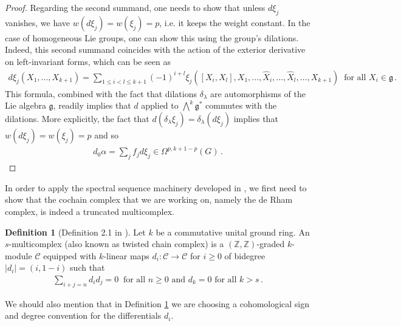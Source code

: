 \documentclass[dvipsnames]{amsart}
\theoremstyle{definition}
\newtheorem{definition}[theorem]{Definition}
\theoremstyle{definition}
\numberwithin{equation}{section}
\newcommand{\Z}{\mathbb{Z}}
\begin{document}
\begin{proof}
Regarding the second summand, one needs to show that unless $d\xi_j$ vanishes, we have $w(d\xi_j)=w(\xi_j)=p$, i.e. it keeps the weight constant. In the case of homogeneous Lie groups, one can show this using the group's dilations. Indeed, this second summand coincides with the action of the exterior derivative on left-invariant forms, which can be seen as
\begin{align}\label{eq: formula for d_0}
    d\xi_j(X_1,\ldots,X_{k+1})=\sum_{1\le i<l\le k+1}(-1)^{i+l}\xi_j([X_i,X_l],X_1,\ldots,\hat{X}_i,\ldots,\hat{X}_l,\ldots,X_{k+1})\ \text{ for all }X_i\in\mathfrak{g}\,.
\end{align}
This formula, combined with the fact that dilations $\delta_\lambda$ are automorphisms of the Lie algebra $\mathfrak{g}$, readily implies that $d$ applied to $\bigwedge^k\mathfrak{g}^\ast$ commutes with the dilations. More explicitly, the fact that  $d(\delta_\lambda\xi_j)=\delta_\lambda(d\xi_j)$ implies that $w(d\xi_j)=w(\xi_j)=p$ and so
\begin{align*}
    d_0\alpha=\sum_jf_jd\xi_j\in\Omega^{p,k+1-p}(G)\,.
\end{align*}
\end{proof}
In order to apply the spectral sequence machinery developed in \cite{tripaldi2026spectralcomplexestruncatedmulticomplexes}, we first need to show that the cochain complex that we are working on, namely the de Rham complex, is indeed a truncated multicomplex.
\begin{definition}[Definition 2.1 in \cite{livernet2020spectral}] \label{def: multicomplex}Let $k$ be a commutative unital ground ring. An $s$-multicomplex (also known as twisted chain complex) is a $(\Z,\Z)$-graded $k$-module $\mathcal{C}$ equipped with $k$-linear maps $d_i\colon\mathcal{C}\to\mathcal{C}$ for $ i\ge 0$ of bidegree $\vert d_i\vert=(i,1-i)$ such that
\begin{align}\label{eq: rules maps}
    \sum_{i+j=n}d_id_j=0\ \text{ for all }n\ge 0\text{ and }d_k=0\text{ for all }k >s\,.
\end{align}
\end{definition}
We should also mention that in Definition \ref{def: multicomplex} we are choosing a cohomological sign and degree convention for the differentials $d_i$. 
\end{document}
